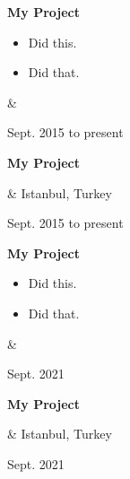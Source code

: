 \documentclass[10pt, letterpaper]{article}
\newenvironment{highlights}{
        \begin{itemize}[
                topsep=0pt,
                parsep=0.10 cm,
                partopsep=0pt,
                itemsep=0pt,
                after=\relax,
                leftmargin=0.4 cm + 3pt
            ]
    }{
        \end{itemize}
    } %
\let\originalTabularx\tabularx
\let\originalEndTabularx\endtabularx
\renewenvironment{tabularx}{\bgroup\centering\originalTabularx}{\originalEndTabularx\par\egroup}
\begin{document}
        \vspace{0.2 cm}
        \begin{tabularx}{
            \textwidth-0.4 cm-0.13cm
        }{
            K{0.2 cm}
            R{4.1 cm}
        }
            \textbf{My Project}

            \vspace{0.10 cm}

            \begin{highlights}
                \item Did this.
                \item Did that.
            \end{highlights}
            &
            

            Sept. 2015 to present
        \end{tabularx}


        \vspace{0.2 cm}
        \begin{tabularx}{
            \textwidth-0.4 cm-0.13cm
        }{
            K{0.2 cm}
            R{4.1 cm}
        }
            \textbf{My Project}

            \vspace{0.10 cm}

            &
            Istanbul, Turkey

            Sept. 2015 to present
        \end{tabularx}


        \vspace{0.2 cm}
        \begin{tabularx}{
            \textwidth-0.4 cm-0.13cm
        }{
            K{0.2 cm}
            R{4.1 cm}
        }
            \textbf{My Project}

            \vspace{0.10 cm}

            \begin{highlights}
                \item Did this.
                \item Did that.
            \end{highlights}
            &
            

            Sept. 2021
        \end{tabularx}


        \vspace{0.2 cm}
        \begin{tabularx}{
            \textwidth-0.4 cm-0.13cm
        }{
            K{0.2 cm}
            R{4.1 cm}
        }
            \textbf{My Project}

            \vspace{0.10 cm}

            &
            Istanbul, Turkey

            Sept. 2021
        \end{tabularx}
\end{document}
